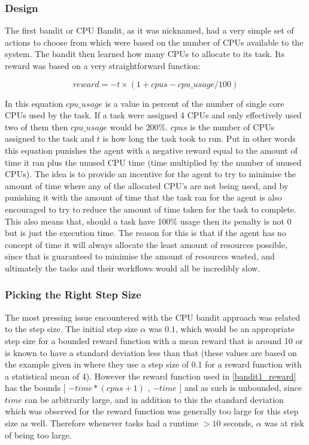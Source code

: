 \subsubsection{Design}
\label{subsub:bandit1_design}

The first bandit or CPU Bandit, as it was nicknamed, had a very simple set of actions to choose from which were based on the number of CPUs available to the system. The bandit then learned how many CPUs to allocate to its task. Its reward was based on a very straightforward function:

\begin{equation}
\label{bandit1_reward}
reward = -t\times(1+cpus - cpu\_usage/100)
\end{equation}


In this equation $cpu\_usage$ is a value in percent of the number of single core CPUs used by the task. If a task were assigned 4 CPUs and only effectively used two of them then $cpu\_usage$ would be $200$\%. $cpus$ is the number of CPUs assigned to the task and $t$ is how long the task took to run. Put in other words this equation punishes the agent with a negative reward equal to the amount of time it ran plus the unused CPU time (time multiplied by the number of unused CPUs). The idea is to provide an incentive for the agent to try to minimise the amount of time where any of the allocated CPU’s are not being used, and by punishing it with the amount of time that the task ran for the agent is also encouraged to try to reduce the amount of time taken for the task to complete. This also means that, should a task have 100\% usage then its penalty is not 0 but is just the execution time. The reason for this is that if the agent has no concept of time it will always allocate the least amount of resources possible, since that is guaranteed to minimise the amount of resources wasted, and ultimately the tasks and their workflows would all be incredibly slow. 

\subsubsection{Picking the Right Step Size}
\label{subsub:const_stepsize}
The most pressing issue encountered with the CPU bandit approach was related to the step size. The initial step size $\alpha$ was $0.1$, which would be an appropriate step size for a bounded reward function with a mean reward that is around 10 or is known to have a standard deviation less than that (these values are based on the example given in \cite{sutton_barto} where they use a step size of 0.1 for a reward function with a statistical mean of 4). However the reward function used in \ref{bandit1_reward} has the bounds [ $-time*(cpus+1)$ , $-time$ ] and as such is unbounded, since $time$ can be arbitrarily large, and in addition to this the standard deviation which was observed for the reward function was generally too large for this step size as well. Therefore whenever tasks had a runtime $> 10$ seconds, $\alpha$ was at risk of being too large. 

